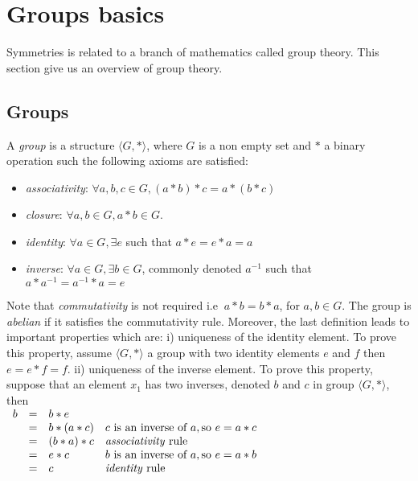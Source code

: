 

\section{Groups basics}

Symmetries is related to a branch of mathematics called group theory. This section give us an overview of group
theory.

\subsection{Groups}

A \emph{group} is a structure $\langle G, * \rangle$, where $G$ is a non empty set and $*$ a binary
operation such the following axioms are satisfied:
\begin{itemize}[noitemsep,nolistsep]
	\item \emph{associativity}: $\forall a, b, c \in G, (a * b) * c = a * (b * c)$
	\item \emph{closure}: $\forall a, b \in G, a * b \in G$.
	\item \emph{identity}: $\forall a \in G, \exists e$ such that $ a * e = e * a = a$
	\item \emph{inverse}:  $\forall a \in G, \exists b \in G$, commonly denoted $a^{-1}$ such that
	 $a * a^{-1} = a^{-1} * a = e$
\end{itemize}

Note that \emph{commutativity} is not required i.e $\ a * b = b * a$, for $a, b \in G$.
The group is \emph{abelian} if it satisfies the commutativity rule.
Moreover, the last definition leads to important properties which are: i) uniqueness of the identity element. 
To prove this property, assume $\langle G, * \rangle$ a group with two identity elements $e$ and $f$ 
then $ e = e * f = f$.
ii) uniqueness of the inverse element. To prove this property, suppose that an element $x_1$ has two inverses,
denoted $b$ and $c$ in group $\langle G, * \rangle$, then\\
	$\begin{array}{lcll}					
			b & = & b * e & \\
			  & = & b * (a * c) & c \text{ is an inverse of } a, \text{so } e = a * c\\
			  & = & (b * a) * c &   \text{\emph{associativity} rule}\\
			  & = & e * c       & b \text{ is an inverse of } a, \text{so } e = a * b\\
			  & = & c           &   \text{\emph{identity} rule}
	\end{array}$

